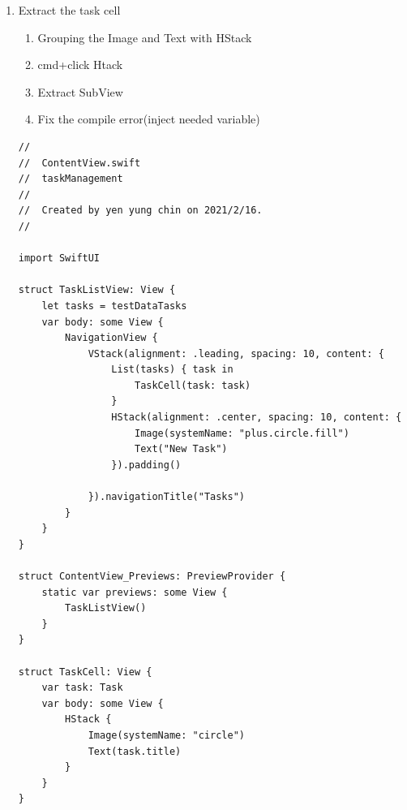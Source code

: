 \documentclass[a4paper,12pt]{article}
\begin{document}
\begin{enumerate}
\begin{enumerate}
\begin{lstlisting}
import SwiftUI

struct TaskListView: View {
    let tasks = testDataTasks
    var body: some View {
        NavigationView {
            VStack(alignment: .leading, spacing: 10, content: {
                List(tasks) { task in
                    Image(systemName: "circle")
                    Text(task.title)
                }
                HStack(alignment: .center, spacing: 10, content: {
                    Image(systemName: "plus.circle.fill")
                    Text("New Task")
                }).padding()

            }).navigationTitle("Tasks")
        }
    }
}

struct ContentView_Previews: PreviewProvider {
    static var previews: some View {
        TaskListView()
    }
}

\end{lstlisting}
\item Extract the task cell
\label{sec:org91adb46}
\begin{enumerate}
\item Grouping the Image and Text with HStack\\
\item cmd+click Htack\\
\item Extract SubView\\
\item Fix the compile error(inject needed variable)\\
\end{enumerate}
\lstset{breaklines=true,language=swift,label= ,caption= ,captionpos=b,firstnumber=1,numbers=left}
\begin{lstlisting}
//
//  ContentView.swift
//  taskManagement
//
//  Created by yen yung chin on 2021/2/16.
//

import SwiftUI

struct TaskListView: View {
    let tasks = testDataTasks
    var body: some View {
        NavigationView {
            VStack(alignment: .leading, spacing: 10, content: {
                List(tasks) { task in
                    TaskCell(task: task)
                }
                HStack(alignment: .center, spacing: 10, content: {
                    Image(systemName: "plus.circle.fill")
                    Text("New Task")
                }).padding()

            }).navigationTitle("Tasks")
        }
    }
}

struct ContentView_Previews: PreviewProvider {
    static var previews: some View {
        TaskListView()
    }
}

struct TaskCell: View {
    var task: Task
    var body: some View {
        HStack {
            Image(systemName: "circle")
            Text(task.title)
        }
    }
}

\end{lstlisting}
\end{enumerate}
\end{enumerate}
\end{document}
